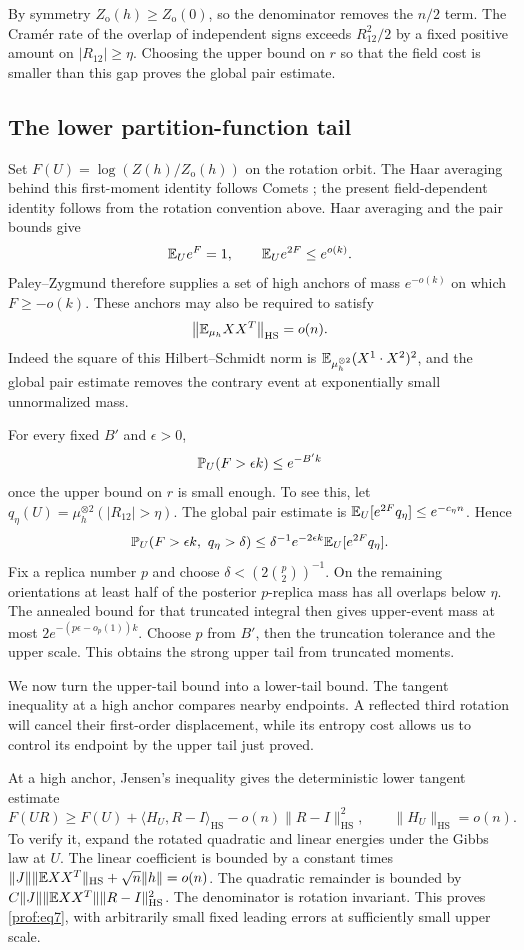 By symmetry $Z_{\mathrm o}(h)\ge Z_{\mathrm o}(0)$, so the denominator
removes the $n/2$ term. The Cram\'er rate of the overlap of independent
signs exceeds $R_{12}^2/2$ by a fixed positive amount on
$|R_{12}|\ge\eta$. Choosing the upper bound on $r$ so that the field
cost is smaller than this gap proves the global pair estimate.

\subsection{The lower partition-function tail}
\label{prof:subsec:controlled-rotation}

Set $F(U)=\log(Z(h)/Z_{\mathrm o}(h))$ on the rotation orbit.
The Haar averaging behind this first-moment identity follows
Comets \cite[Equations~(2.1)--(2.2)]{Comets1996Spherical}; the present
field-dependent identity follows from the rotation convention above.
Haar averaging and the pair bounds give
\[
 \mathbb E_Ue^F=1,\qquad \mathbb E_Ue^{2F}\le e^{o(k)}.
\]
Paley--Zygmund therefore supplies a set of high anchors of mass
$e^{-o(k)}$ on which $F\ge-o(k)$.  These anchors may also be
required to satisfy
\[
 \left\|\mathbb E_{\mu_h}XX^T\right\|_{\mathrm{HS}}=o(n).
\]
Indeed the square of this Hilbert--Schmidt norm is
$\mathbb E_{\mu_h^{\otimes2}}(X^1\cdot X^2)^2$, and the global pair
estimate removes the contrary event at exponentially small
unnormalized mass.

For every fixed $B'$ and $\epsilon>0$,
\[
 \mathbb P_U(F>\epsilon k)\le e^{-B'k}
\]
once the upper bound on $r$ is small enough. To see this, let
$q_\eta(U)=\mu_h^{\otimes2}(|R_{12}|>\eta)$. The global pair estimate is
$\mathbb E_U[e^{2F}q_\eta]\le e^{-c_\eta n}$. Hence
\[
 \Pprob_U(F>\epsilon k,\ q_\eta>\delta)
 \le\delta^{-1}e^{-2\epsilon k}\E_U[e^{2F}q_\eta].
\]
Fix a replica number $p$ and choose
$\delta<(2\binom p2)^{-1}$. On the remaining orientations at least
half of the posterior $p$-replica mass has all overlaps below $\eta$.
The annealed bound for that truncated integral then gives upper-event
mass at most $2e^{-(p\epsilon-o_p(1))k}$. Choose $p$ from $B'$, then
the truncation tolerance and the upper scale. This obtains the strong
upper tail from truncated moments.

We now turn the upper-tail bound into a lower-tail bound. The tangent
inequality at a high anchor compares nearby endpoints. A reflected third
rotation will cancel their first-order displacement, while its entropy
cost allows us to control its endpoint by the upper tail just proved.

At a high anchor, Jensen's inequality gives the deterministic lower
tangent estimate
\begin{equation}\label{prof:eq7}
 F(UR)\ge F(U)+\langle H_U,R-I\rangle_{\mathrm{HS}}
       -o(n)\|R-I\|_{\mathrm{HS}}^2,
 \qquad \|H_U\|_{\mathrm{HS}}=o(n).
\end{equation}
To verify it, expand the rotated quadratic and linear energies under
the Gibbs law at $U$.  The linear coefficient is bounded by a
constant times
$\|J\|\|\mathbb E XX^T\|_{\mathrm{HS}}+\sqrt n\|h\|=o(n)$.
The quadratic remainder is bounded by
$C\|J\|\|\mathbb E XX^T\|\|R-I\|_{\mathrm{HS}}^2$.
The denominator is rotation invariant.  This proves
\eqref{prof:eq7}, with arbitrarily small fixed leading errors at
sufficiently small upper scale.

